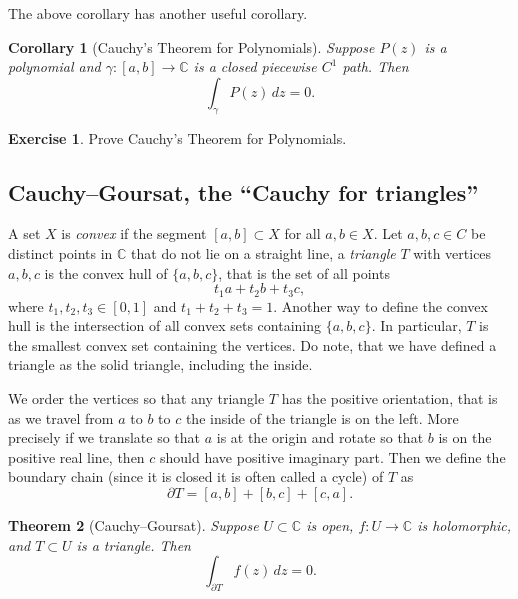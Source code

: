 \documentclass[12pt,openany]{book}
\newcommand{\C}{{\mathbb{C}}}
\newcommand{\myindex}[1]{#1\index{#1}}
\theoremstyle{plain}
\newtheorem{thm}{Theorem}[section]
\newtheorem{cor}[thm]{Corollary}
\theoremstyle{remark}
\theoremstyle{definition}
\newenvironment{exbox}{%
    \def\FrameCommand{\vrule width 1pt \relax\hspace {10pt}}%
    \MakeFramed {\advance \hsize -\width \FrameRestore }%
}{%
    \endMakeFramed
}
\theoremstyle{exercise}
\newtheorem{exercise}{Exercise}[section]
\theoremstyle{example}
\begin{document}
The above corollary has another useful corollary.

\begin{cor}[Cauchy's Theorem for Polynomials]
Suppose $P(z)$ is a polynomial and $\gamma \colon [a,b] \to \C$ is a closed
piecewise $C^1$ path.  Then
\begin{equation*}
\int_\gamma P(z) \, dz = 0 .
\end{equation*}
\end{cor}

\begin{exbox}
\begin{exercise}
Prove Cauchy's Theorem for Polynomials.
\end{exercise}
\end{exbox}

\subsection{Cauchy--Goursat, the ``Cauchy for triangles''}

A set $X$ is \emph{\myindex{convex}} if the segment $[a,b] \subset X$ for all $a,b \in
X$.
Let $a,b,c \in C$ be distinct points in $\C$ that do not lie on a
straight line, a \emph{\myindex{triangle}} $T$
with vertices $a,b,c$ is the convex hull
of $\{ a,b,c \}$, that is
the set of all points
\begin{equation*}
t_1 a + t_2 b + t_3 c ,
\end{equation*}
where $t_1,t_2,t_3 \in [0,1]$ and $t_1+t_2+t_3 = 1$.  Another way to define
the convex hull is the intersection of all convex sets containing $\{ a,b,c \}$.
In particular, $T$ is the smallest convex set containing the vertices.
Do note, that we have defined a triangle as the solid triangle, including
the inside.

We order the vertices so that any triangle $T$ has the positive orientation,
that is as we travel from $a$ to $b$ to $c$ the inside of the triangle 
is on the left.  More precisely if we translate so that $a$ is
at the origin and rotate so that $b$ is on the positive real line, then $c$
should have positive imaginary part.  Then we define the boundary chain
(since it is closed it is often called a cycle) of $T$ as
\begin{equation*}
\partial T = [a,b] + [b,c] + [c,a] .
\end{equation*}

\begin{thm}[Cauchy--Goursat]
Suppose $U \subset \C$ is open, $f \colon U \to \C$ is holomorphic,
and $T \subset U$ is a triangle.  Then
\begin{equation*}
\int_{\partial T} f(z) \, dz = 0 .
\end{equation*}
\end{thm}
\end{document}
